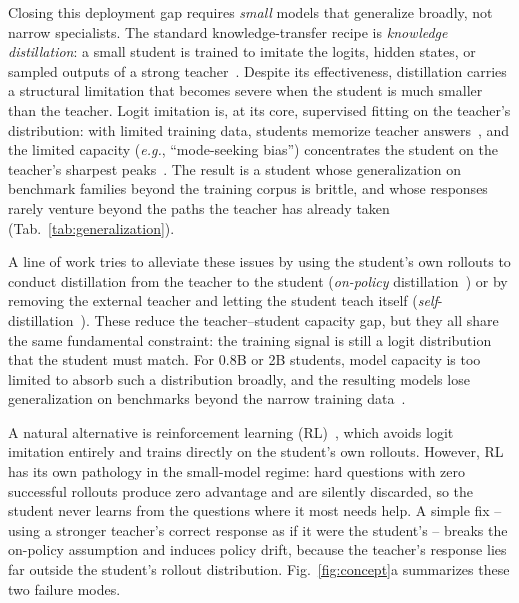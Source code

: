 \documentclass{llmxive}
\begin{document}
Closing this deployment gap requires \emph{small} models that generalize broadly, not narrow specialists. The standard knowledge-transfer recipe is \emph{knowledge distillation}: a small student is trained to imitate the logits, hidden states, or sampled outputs of a strong teacher~\citep{hinton2015distilling,gou2021knowledge,sanh2019distilbert,gu2024minillm,ko2024distillm}. Despite its effectiveness, distillation carries a structural limitation that becomes severe when the student is much smaller than the teacher. Logit imitation is, at its core, supervised fitting on the teacher's distribution: with limited training data, students memorize teacher answers~\citep{kim2026does,li2026rethinking,song2026survey}, and the limited capacity (\textit{e.g.}, ``mode-seeking bias'') concentrates the student on the teacher's sharpest peaks~\citep{gu2024minillm,agarwal2024policy}. The result is a student whose generalization on benchmark families beyond the training corpus is brittle, and whose responses rarely venture beyond the paths the teacher has already taken (Tab.~\ref{tab:generalization}).

A line of work tries to alleviate these issues by using the student's own rollouts to conduct distillation from the teacher to the student (\emph{on-policy} distillation~\citep{agarwal2024policy,lu2025onpolicydistillation,fu2026revisiting,bousselham2025vold,yang2026learning,zhang2026fast,wu2026lightning}) or by removing the external teacher and letting the student teach itself (\emph{self}-distillation~\citep{shenfeld2026self,zhao2026self,hubotter2026reinforcement,kim2026does,yang2026self}). These reduce the teacher--student capacity gap, but they all share the same fundamental constraint: the training signal is still a logit distribution that the student must match. For 0.8B or 2B students, model capacity is too limited to absorb such a distribution broadly, and the resulting models lose generalization on benchmarks beyond the narrow training data~\citep{kim2026does,li2026rethinking,song2026survey}.

A natural alternative is reinforcement learning (RL)~\citep{guo2025deepseek,shao2024deepseekmath,hu2025reinforce++,yu2025dapo,liu2025understanding,he2025justrl,khatri2025art,liu2025prorl,hu2025brorl,liu2025dler,liu2026gdpo}, which avoids logit imitation entirely and trains directly on the student's own rollouts. However, RL has its own pathology in the small-model regime: hard questions with zero successful rollouts produce zero advantage and are silently discarded, so the student never learns from the questions where it most needs help. A simple fix -- using a stronger teacher's correct response as if it were the student's -- breaks the on-policy assumption and induces policy drift, because the teacher's response lies far outside the student's rollout distribution. Fig.~\ref{fig:concept}a summarizes these two failure modes.
\end{document}
